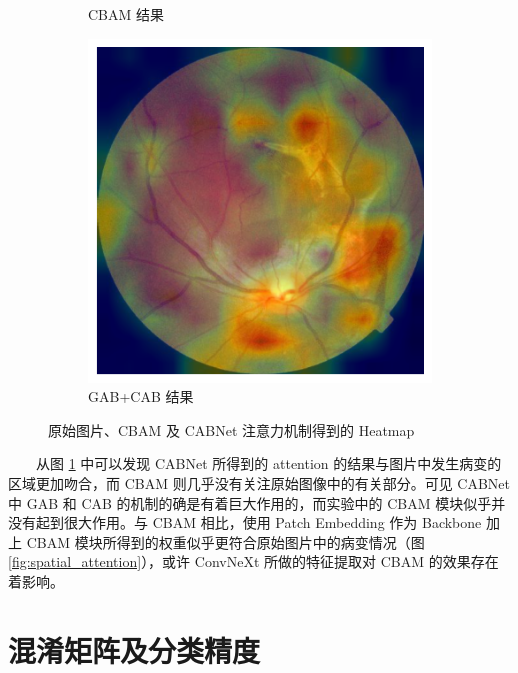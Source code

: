 \documentclass[twocolumn, fontsize=10pt]{article}
\begin{document}
\begin{appendices}
\begin{figure}[H]
\begin{subfigure}[b]{0.2\textwidth}
        \caption{CBAM 结果}
    \end{subfigure}
    \hspace{5mm}
    \begin{subfigure}[b]{0.2\textwidth}
        \raggedright
        \includegraphics[width=\textwidth]{cabnet-heatmap-3.png}
        \caption{GAB+CAB 结果}
    \end{subfigure}
    
    \caption{原始图片、CBAM 及 CABNet 注意力机制得到的 Heatmap}
    \label{fig:attention_cbam_cabnet}
\end{figure}

　　从图 \ref{fig:attention_cbam_cabnet} 中可以发现 CABNet 所得到的 attention 的结果与图片中发生病变的区域更加吻合，而 CBAM 则几乎没有关注原始图像中的有关部分。可见 CABNet 中 GAB 和 CAB 的机制的确是有着巨大作用的，而实验中的 CBAM 模块似乎并没有起到很大作用。与 CBAM 相比，使用 Patch Embedding 作为 Backbone 加上 CBAM 模块所得到的权重似乎更符合原始图片中的病变情况（图 \ref{fig:spatial_attention}），或许 ConvNeXt 所做的特征提取对 CBAM 的效果存在着影响。

\section{混淆矩阵及分类精度}


\end{appendices}
\end{document}
